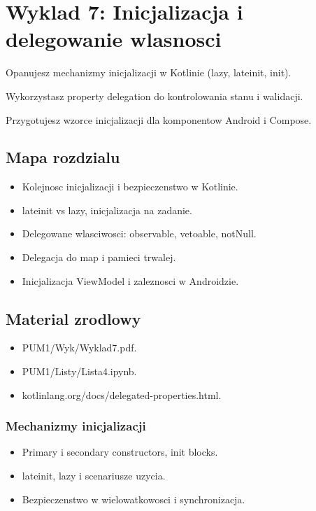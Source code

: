 \chapter{Wyklad 7: Inicjalizacja i delegowanie wlasnosci}

\begin{learningobjectives}
  \item Opanujesz mechanizmy inicjalizacji w Kotlinie (lazy, lateinit, init).
  \item Wykorzystasz property delegation do kontrolowania stanu i walidacji.
  \item Przygotujesz wzorce inicjalizacji dla komponentow Android i Compose.
\end{learningobjectives}

\section{Mapa rozdzialu}
\begin{itemize}
  \item Kolejnosc inicjalizacji i bezpieczenstwo w Kotlinie.
  \item lateinit vs lazy, inicjalizacja na zadanie.
  \item Delegowane wlasciwosci: observable, vetoable, notNull.
  \item Delegacja do map i pamieci trwalej.
  \item Inicjalizacja ViewModel i zaleznosci w Androidzie.
\end{itemize}

\section{Material zrodlowy}
\begin{itemize}
  \item PUM1/Wyk/Wyklad7.pdf.
  \item PUM1/Listy/Lista4.ipynb.
  \item kotlinlang.org/docs/delegated-properties.html.
\end{itemize}

\subsection{Mechanizmy inicjalizacji}
\begin{itemize}
  \item Primary i secondary constructors, init blocks.
  \item lateinit, lazy i scenariusze uzycia.
  \item Bezpieczenstwo w wielowatkowosci i synchronizacja.
\end{itemize}

